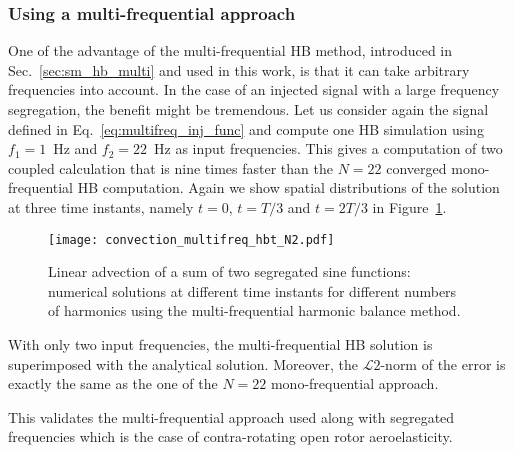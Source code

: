 \subsubsection{Using a multi-frequential approach}

One of the advantage of the multi-frequential HB method, 
introduced in Sec.~\ref{sec:sm_hb_multi}
and used in this work, is that it can take arbitrary frequencies into account.
In the case of an injected signal with a large frequency segregation, the
benefit might be tremendous. Let us consider again the signal defined in 
Eq.~\eqref{eq:multifreq_inj_func} and compute one HB simulation using 
$f_1=1$~Hz and $f_2=22$~Hz as input frequencies. This gives a computation
of two coupled calculation
that is nine times faster than the $N=22$ converged mono-frequential
HB computation.
Again
we show spatial distributions of the solution
at three time instants, namely $t=0$, $t=T/3$ and $t=2T/3$
in Figure~\ref{fig:inj_multifreq_hb}.
\begin{figure}[htp]
  \centering
  \texttt{[image: convection\_multifreq\_hbt\_N2.pdf]}
  \caption{Linear advection of a sum of two segregated sine functions: 
  numerical solutions at different time instants for different numbers of harmonics using the
  multi-frequential harmonic balance method.}
  \label{fig:inj_multifreq_hb}
\end{figure}
With only two input frequencies, the multi-frequential
HB solution is superimposed with the analytical solution.
Moreover, the $\mathcal{L}2$-norm of the error is 
exactly the same as the one of the $N=22$ mono-frequential
approach.

This validates the multi-frequential approach 
used along with segregated frequencies which is 
the case of contra-rotating open rotor aeroelasticity.
